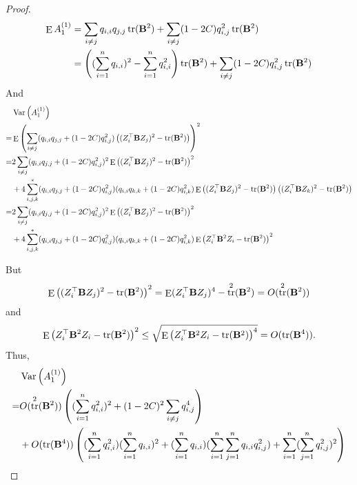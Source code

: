\documentclass[11pt]{article}
\DeclareMathOperator{\mytr}{tr}
\DeclareMathOperator{\myE}{E}
\DeclareMathOperator{\myVar}{Var}
\theoremstyle{plain}
\theoremstyle{definition}
\theoremstyle{remark}
\begin{document}
\begin{proof}
\begin{equation*}
    \begin{split}
    \myE A_1^{(1)}
    &=
    \sum_{i\neq j} q_{i,i} q_{j,j}  \mytr(\BB^2)
    + \sum_{i\neq j}(1-2C) q_{i,j}^2  \mytr(\BB^2)
    \\
    &=
\left((\sum_{i=1}^n q_{i,i})^2 -\sum_{i=1}^n q_{i,i}^2\right)  \mytr(\BB^2)
    + \sum_{i\neq j}(1-2C) q_{i,j}^2  \mytr(\BB^2)
    \\
    \end{split}
\end{equation*}
And
\begin{equation*}
    \begin{split}
    &\myVar \left( A_1^{(1)} \right)
    \\
    =
    &
    \myE \left(
    \sum_{i\neq j}( q_{i,i} q_{j,j} + (1-2C) q_{i,j}^2 ) \left( (Z_i^\top \BB Z_j)^2- \mytr (\BB^2)\right)
\right)^2
\\
=
    &
    2\sum_{i\neq j}( q_{i,i} q_{j,j} + (1-2C) q_{i,j}^2 )^2 \myE\left( (Z_i^\top \BB Z_j)^2- \mytr (\BB^2)\right)^2
    \\
    &+
    4\sum_{i,j,k}^*( q_{i,i} q_{j,j} + (1-2C) q_{i,j}^2 ) ( q_{i,i} q_{k,k} + (1-2C) q_{i,k}^2 ) \myE\left( (Z_i^\top \BB Z_j)^2- \mytr (\BB^2)\right)\left( (Z_i^\top \BB Z_k)^2- \mytr (\BB^2)\right)
\\
=
    &
    2\sum_{i\neq j}( q_{i,i} q_{j,j} + (1-2C) q_{i,j}^2 )^2 \myE\left( (Z_i^\top \BB Z_j)^2- \mytr (\BB^2)\right)^2
    \\
    &+
    4\sum_{i,j,k}^*( q_{i,i} q_{j,j} + (1-2C) q_{i,j}^2 ) ( q_{i,i} q_{k,k} + (1-2C) q_{i,k}^2 ) 
    \myE\left( Z_i^\top \BB^2 Z_i - \mytr (\BB^2)\right)^2
    \end{split}
\end{equation*}

But
\begin{equation*}
    \begin{split}
        \myE\left( (Z_i^\top \BB Z_j)^2- \mytr (\BB^2)\right)^2
        =
        \myE(Z_i^\top \BB Z_j)^4- \mytr^2 (\BB^2)
        =O(\mytr^2(\BB^2))
    \end{split}
\end{equation*}
and
\begin{equation*}
    \myE\left( Z_i^\top \BB^2 Z_i - \mytr (\BB^2)\right)^2
    \leq
    \sqrt{
        \myE\left( Z_i^\top \BB^2 Z_i - \mytr (\BB^2)\right)^4
    }
    =O(\mytr(\BB^4)).
\end{equation*}
Thus,
\begin{equation*}
    \begin{split}
    &\myVar \left( A_1^{(1)} \right)
    \\
    =&O(\mytr^2(\BB^2)) \left(
        (\sum_{i=1}^n q_{i,i}^2)^2
        +
        (1-2C)^2
        \sum_{i\neq j} q_{i,j}^4
    \right)
    \\
    &+
    O(\mytr(\BB^4))
    \left(
        (\sum_{i=1}^n q_{i,i}^2)
        (\sum_{i=1}^n q_{i,i})^2
        +(\sum_{i=1}^n q_{i,i})
        (\sum_{i=1}^n\sum_{j=1}^n q_{i,i}q_{i,j}^2)
        +
        \sum_{i=1}^n (\sum_{j=1}^n q_{i,j}^2)^2
    \right)
    \end{split}
\end{equation*}


\end{proof}
\end{document}
